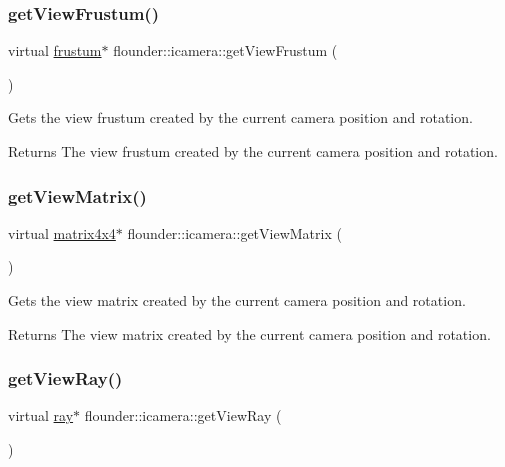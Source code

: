 \subsubsection{\texorpdfstring{get\+View\+Frustum()}{getViewFrustum()}}
{\footnotesize\ttfamily virtual \hyperlink{classflounder_1_1frustum}{frustum}$\ast$ flounder\+::icamera\+::get\+View\+Frustum (\begin{DoxyParamCaption}{ }\end{DoxyParamCaption})\hspace{0.3cm}{\ttfamily [pure virtual]}}



Gets the view frustum created by the current camera position and rotation. 

\begin{DoxyReturn}{Returns}
The view frustum created by the current camera position and rotation. 
\end{DoxyReturn}
\mbox{\label{classflounder_1_1icamera_a64b4b040c903d37b3963aa2774c379db}} 
\subsubsection{\texorpdfstring{get\+View\+Matrix()}{getViewMatrix()}}
{\footnotesize\ttfamily virtual \hyperlink{classflounder_1_1matrix4x4}{matrix4x4}$\ast$ flounder\+::icamera\+::get\+View\+Matrix (\begin{DoxyParamCaption}{ }\end{DoxyParamCaption})\hspace{0.3cm}{\ttfamily [pure virtual]}}



Gets the view matrix created by the current camera position and rotation. 

\begin{DoxyReturn}{Returns}
The view matrix created by the current camera position and rotation. 
\end{DoxyReturn}
\mbox{\label{classflounder_1_1icamera_a9b461abd1e1fd39127d3f2bc531aa847}} 
\subsubsection{\texorpdfstring{get\+View\+Ray()}{getViewRay()}}
{\footnotesize\ttfamily virtual \hyperlink{classflounder_1_1ray}{ray}$\ast$ flounder\+::icamera\+::get\+View\+Ray (\begin{DoxyParamCaption}{ }\end{DoxyParamCaption})\hspace{0.3cm}{\ttfamily [pure virtual]}}



